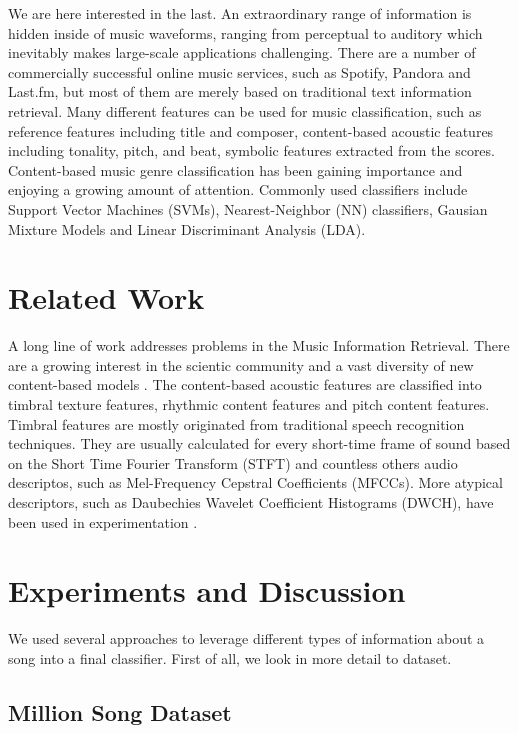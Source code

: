 \documentclass[10pt,twocolumn,letterpaper]{article}
\begin{document}
We are here interested in the last. An extraordinary range of information is
hidden inside of music waveforms, ranging from perceptual to auditory which
inevitably makes large-scale applications challenging. There are a number of commercially successful online music services, 
such as Spotify, Pandora and Last.fm, but most of them are merely
based on traditional text information retrieval. Many different features can be
used for music classification, such as reference features including title and
composer, content-based acoustic features including tonality, pitch, and beat,
symbolic features extracted from the scores. Content-based music genre classification has been gaining importance and enjoying a growing amount of
attention. Commonly used classifiers
include Support Vector Machines (SVMs), Nearest-Neighbor (NN) classifiers, Gausian Mixture Models and Linear Discriminant Analysis (LDA).

\section{Related Work}

A long line of work addresses problems in the Music Information Retrieval. There
are a growing interest in the scientic community and a vast diversity of new
content-based models \cite{conf/sigir/HuO12} \cite{Bou-rabee12classifyingthe}.
The content-based acoustic features are classified into timbral texture features, rhythmic content features and pitch content
features. Timbral features are mostly originated from traditional speech
recognition techniques. They are usually calculated for every short-time frame
of sound based on the Short Time Fourier Transform (STFT) and countless others
audio descriptos, such as Mel-Frequency Cepstral Coefficients (MFCCs). More
atypical descriptors, such as Daubechies Wavelet
Coefficient Histograms (DWCH), have been used in experimentation
\cite{Li:2003:CSC:860435.860487}.
\section{Experiments and Discussion}

We used several approaches to leverage different types of information about a
song into a final classifier. First of all, we look in more detail to dataset.

\subsection{Million Song Dataset}
\end{document}
